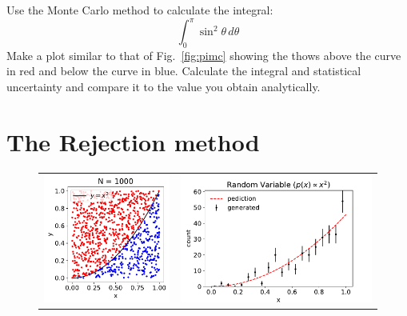 \begin{plot} \end{plot}
Use the Monte Carlo method to calculate the integral:
\begin{displaymath}
  \int_0^\pi \sin^2 \theta \, d\theta
\end{displaymath}
Make a plot similar to that of Fig.~\ref{fig:pimc} showing the thows
above the curve in red and below the curve in blue.  Calculate the
integral and statistical uncertainty and compare it to the value you obtain analytically.

\section{The Rejection method}

\begin{figure}[htbp]
\begin{center}
  \begin{tabular}{cc}
  \includegraphics[height=0.30\textheight]{figs/monte_carlo/rejectmc.pdf} &
  \includegraphics[height=0.30\textheight]{figs/monte_carlo/quadhist.pdf} \\

\end{tabular}
\end{center}
\end{figure}
